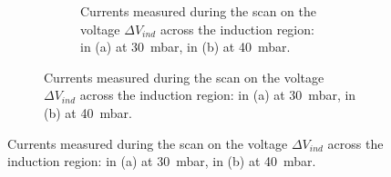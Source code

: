 \documentclass[a4paper, 11 pt]{article}
\newcommand{\Vind}{$\Delta V_{ind}$}
\newcommand{\Vthgem}{$\Delta V_{THGEM}$}
\begin{document}
\begin{figure}[htbp]
\begin{figure}[htbp]
\begin{figure}[!htb]
	\centering
	\caption{Currents measured during the scan on the voltage \Vind{} across the induction region: in (a) at 30~mbar, in (b) at 40~mbar.}
	\label{fig:induction_ROWTHGEM_other_pressures}
\end{figure}




\end{figure}
\end{figure}
\end{document}
